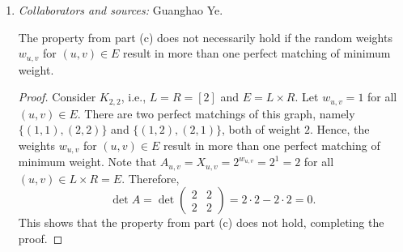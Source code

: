 \documentclass[letterpaper, reqno,11pt]{article}
\DeclareMathOperator{\sign}{sign}
\begin{document}
\begin{enumerate}
\begin{enumerate}
\begin{proof}
\begin{align*}
        &= 2^{w\left(M_{\sigma_1}\right)} \left(\sign\left(\sigma_1\right) + \sum_{i = 2}^\ell \sign\left(\sigma_i\right) 2^{w\left(M_{\sigma_i}\right) - w\left(M_{\sigma_1}\right)}\right).
      \end{align*}
      Therefore,
      $$ |\det A| = 2^{w\left(M_{\sigma_1}\right)} \left|\sign\left(\sigma_1\right) + \sum_{i = 2}^\ell \sign\left(\sigma_i\right) 2^{w\left(M_{\sigma_i}\right) - w\left(M_{\sigma_1}\right)}\right|. $$
      For each $i \in \{ 2, \ldots, \ell \}$, since $w(M_{\sigma_i}) > w(M_{\sigma_1})$ and since weights are integers, then $2^{w(M_{\sigma_i}) - w(M_{\sigma_1})}$ is even. Since $\sign(\sigma_i) \in \{ 1, -1 \}$ for all $i \in [\ell]$, then
      \begin{equation} \label{eq:3c-odd}
        \left|\sign\left(\sigma_1\right) + \sum_{i = 2}^\ell \sign\left(\sigma_i\right) 2^{w\left(M_{\sigma_i}\right) - w\left(M_{\sigma_1}\right)}\right|
      \end{equation}
      is odd. Suppose that the binary representation of \eqref{eq:3c-odd} is $1 + \sum_{i = 1}^{k'} \beta_i 2^i$, where $\beta_i \in \{ 0, 1 \}$ for all $i \in [k]$. Therefore,
      $$ |\det A| = 2^{w\left(M_{\sigma_1}\right)} \left(1 + \sum_{i = 1}^{k'} \beta_i 2^i\right) = 2^{w\left(M_{\sigma_1}\right)} + \sum_{i = 1}^{k'} \beta_i 2^{w\left(M_{\sigma_1}\right) + i}. $$
      This completes the proof by the uniqueness of binary representations.
    \end{proof}

    \clearpage

    \item \noindent\emph{Collaborators and sources:} Guanghao Ye.

    \bigskip

    The property from part (c) does not necessarily hold if the random weights $w_{u, v}$ for $(u, v) \in E$ result in more than one perfect matching of minimum weight.

    \begin{proof}
      Consider $K_{2, 2}$, i.e., $L = R = [2]$ and $E = L \times R$. Let $w_{u, v} = 1$ for all $(u, v) \in E$. There are two perfect matchings of this graph, namely $\{ (1, 1), (2, 2) \}$ and $\{ (1, 2), (2, 1) \}$, both of weight $2$. Hence, the weights $w_{u, v}$ for $(u, v) \in E$ result in more than one perfect matching of minimum weight. Note that $A_{u, v} = X_{u, v} = 2^{w_{u, v}} = 2^1 = 2$ for all $(u, v) \in L \times R = E$. Therefore,
      $$ \det A = \det \begin{pmatrix}
        2 & 2 \\
        2 & 2
      \end{pmatrix} = 2 \cdot 2 - 2 \cdot 2 = 0. $$
      This shows that the property from part (c) does not hold, completing the proof.
    \end{proof}


\end{enumerate}
\end{enumerate}
\end{document}
